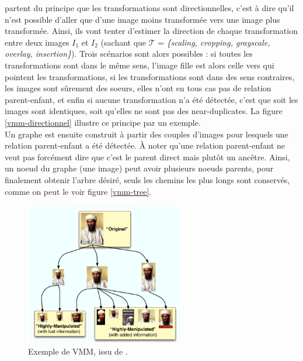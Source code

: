 \documentclass[utf8,final]{stageM2R} %
\begin{document}
 partent du principe que les transformations sont directionnelles, c'est à dire qu'il n'est possible d'aller que d'une image moins transformée vers une image plus transformée. Ainsi, ils vont tenter d'estimer la direction de chaque transformation entre deux images $I_{1}$ et $I_{2}$ (sachant que $\mathcal{T}$ = \textit{\{scaling, cropping, grayscale, overlay, insertion\}}). Trois scénarios sont alors possibles : si toutes les transformations sont dans le même sens, l'image fille est alors celle vers qui pointent les transformations, si les transformations sont dans des sens contraires, les images sont sûrement des soeurs, elles n'ont en tous cas pas de relation parent-enfant, et enfin si aucune transformation n'a été détectée, c'est que soit les images sont identiques, soit qu'elles ne sont pas des near-duplicates. La figure \ref{vmm-directionnel} illustre ce principe par un exemple.
\\ \indent
Un graphe est ensuite construit à partir des couples d'images pour lesquels une relation parent-enfant a été détectée. À noter qu'une relation parent-enfant ne veut pas forcément dire que c'est le parent direct mais plutôt un ancêtre. Ainsi, un noeud du graphe (une image) peut avoir plusieurs noeuds parents, pour finalement obtenir l'arbre désiré, seuls les chemins les plus longs sont conservés, comme on peut le voir figure \ref{vmm-tree}.

\begin{figure}
  \begin{center}
    \includegraphics[width=70mm]{images/vmm.png}
    \caption{Exemple de VMM, issu de \autocite{kennedy2008internet}.}
    \label{vmm}
  \end{center}
\end{figure}
\end{document}
